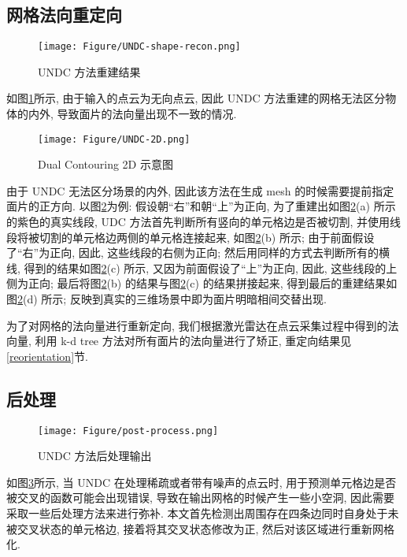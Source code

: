 \subsection{网格法向重定向}
\vspace{0.5em} %
\begin{figure}[H]
	\center
	\texttt{[image: Figure/UNDC-shape-recon.png]}
	\centering
	\caption{UNDC 方法重建结果}\label{fig:fig-shape-recon}
\end{figure}
如图\ref{fig:fig-shape-recon}所示, 由于输入的点云为无向点云, 因此 UNDC 方法重建的网格无法区分物体的内外, 导致面片的法向量出现不一致的情况. 

\begin{figure}[H]
	\center
	\texttt{[image: Figure/UNDC-2D.png]}
	\centering
	\caption{Dual Contouring 2D 示意图}\label{fig:fig-2D-UNDC}
\end{figure}

由于 UNDC 无法区分场景的内外, 因此该方法在生成 mesh 的时候需要提前指定面片的正方向. 
以图\ref{fig:fig-2D-UNDC}为例: 假设朝“右”和朝“上”为正向, 为了重建出如图\ref{fig:fig-2D-UNDC}(a) 所示的紫色的真实线段, UDC 方法首先判断所有竖向的单元格边是否被切割, 并使用线段将被切割的单元格边两侧的单元格连接起来, 如图\ref{fig:fig-2D-UNDC}(b) 所示; 
由于前面假设了“右”为正向, 因此, 这些线段的右侧为正向; 
然后用同样的方式去判断所有的横线, 得到的结果如图\ref{fig:fig-2D-UNDC}(c) 所示, 又因为前面假设了“上”为正向, 因此, 这些线段的上侧为正向; 
最后将图\ref{fig:fig-2D-UNDC}(b) 的结果与图\ref{fig:fig-2D-UNDC}(c) 的结果拼接起来, 得到最后的重建结果如图\ref{fig:fig-2D-UNDC}(d) 所示; 
反映到真实的三维场景中即为面片明暗相间交替出现. 

为了对网格的法向量进行重新定向, 我们根据激光雷达在点云采集过程中得到的法向量, 利用 k-d tree 方法对所有面片的法向量进行了矫正, 重定向结果见\ref{reorientation}节. 

\subsection{后处理}

\begin{figure}[H]
	\center
	\texttt{[image: Figure/post-process.png]}
	\centering
	\caption{UNDC 方法后处理输出}\label{fig:fig-post}
\end{figure}

如图\ref{fig:fig-post}所示, 当 UNDC 在处理稀疏或者带有噪声的点云时, 用于预测单元格边是否被交叉的函数可能会出现错误, 导致在输出网格的时候产生一些小空洞, 因此需要采取一些后处理方法来进行弥补. 
本文首先检测出周围存在四条边同时自身处于未被交叉状态的单元格边, 接着将其交叉状态修改为正, 然后对该区域进行重新网格化. 

